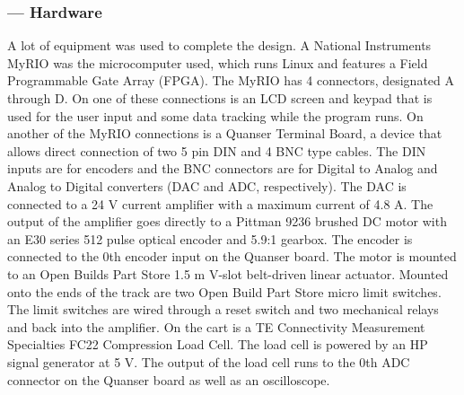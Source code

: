 \subsubsection*{ --- Hardware}
A lot of equipment was used to complete the design. A National Instruments MyRIO was the microcomputer used, which runs Linux and features a Field Programmable Gate Array (FPGA). The MyRIO has 4 connectors, designated A through D. On one of these connections is an LCD screen and keypad that is used for the user input and some data tracking while the program runs. On another of the MyRIO connections is a Quanser Terminal Board, a device that allows direct connection of two 5 pin DIN and 4 BNC type cables. The DIN inputs are for encoders and the BNC connectors are for Digital to Analog and Analog to Digital converters (DAC and ADC, respectively). The DAC is connected to a 24 V current amplifier with a maximum current of 4.8 A. The output of the amplifier goes directly to a Pittman 9236 brushed DC motor with an E30 series 512 pulse optical encoder and 5.9:1 gearbox. The encoder is connected to the 0th encoder input on the Quanser board. The motor is mounted to an Open Builds Part Store 1.5 m V-slot belt-driven linear actuator. Mounted onto the ends of the track are two Open Build Part Store micro limit switches. The limit switches are wired through a reset switch and two mechanical relays and back into the amplifier. On the cart is a TE Connectivity Measurement Specialties FC22 Compression Load Cell. The load cell is powered by an HP signal generator at 5 V. The output of the load cell runs to the 0th ADC connector on the Quanser board as well as an oscilloscope. 